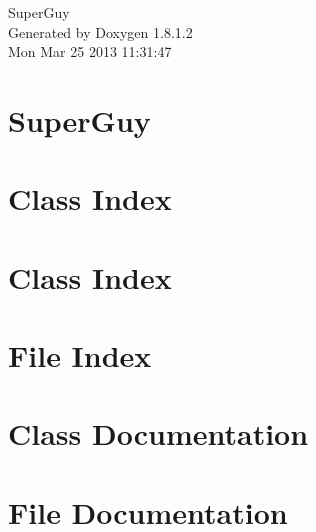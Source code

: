 \documentclass{book}
\begin{document}
\hypersetup{pageanchor=false,citecolor=blue}
\begin{titlepage}
\vspace*{7cm}
\begin{center}
{\Large Super\-Guy }\\
\vspace*{1cm}
{\large Generated by Doxygen 1.8.1.2}\\
\vspace*{0.5cm}
{\small Mon Mar 25 2013 11:31:47}\\
\end{center}
\end{titlepage}
\clearemptydoublepage
{}
\tableofcontents
\clearemptydoublepage
{}
\hypersetup{pageanchor=true,citecolor=blue}
\chapter{Super\-Guy}
\label{index}\hypertarget{index}{}
\chapter{Class Index}

\chapter{Class Index}

\chapter{File Index}

\chapter{Class Documentation}














\chapter{File Documentation}





















\printindex
\end{document}
